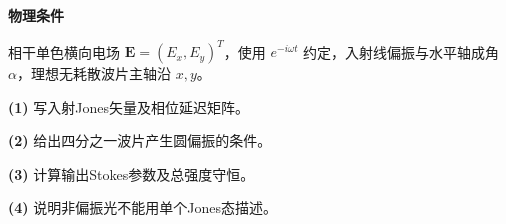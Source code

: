 \textbf{物理条件}\par 相干单色横向电场 \(\boldsymbol E=(E_x,E_y)^T\)，使用 \(e^{-i\omega t}\) 约定，入射线偏振与水平轴成角 \(\alpha\)，理想无耗散波片主轴沿 \(x,y\)。
\par\noindent\textbf{(1)} 写入射Jones矢量及相位延迟矩阵。
\par\noindent\textbf{(2)} 给出四分之一波片产生圆偏振的条件。
\par\noindent\textbf{(3)} 计算输出Stokes参数及总强度守恒。
\par\noindent\textbf{(4)} 说明非偏振光不能用单个Jones态描述。
